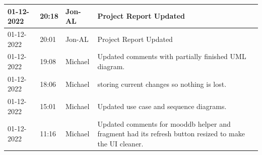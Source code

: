 \documentclass[11pt]{article}
\begin{document}
\begin{center}
\begin{longtable}{|p{2cm}|l|p{2cm}|p{10.5cm}|}
            01-12-2022                                 & 20:18                              & Jon-AL                                  & Project Report Updated                                                                                                                                                                                                                                                                                       \\ \hline
            01-12-2022                                 & 20:01                              & Jon-AL                                  & Project Report Updated                                                                                                                                                                                                                                                                                       \\ \hline
            01-12-2022                                 & 19:08                              & Michael                                 & Updated comments with partially finished UML diagram.                                                                                                                                                                                                                                                        \\ \hline
            01-12-2022                                 & 18:06                              & Michael                                 & storing current changes so nothing is lost.                                                                                                                                                                                                                                                                  \\ \hline
            01-12-2022                                 & 15:01                              & Michael                                 & Updated use case and sequence diagrams.                                                                                                                                                                                                                                                                      \\ \hline
            01-12-2022                                 & 11:16                              & Michael                                 & Updated comments for mooddb helper and fragment had its refresh button resized to make the UI cleaner.                                                                                                                                                                                                       \\ \hline

\end{longtable}
\end{center}
\end{document}
